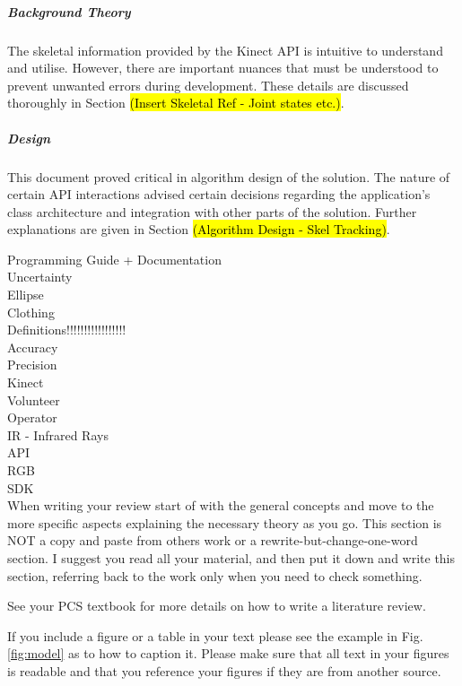 \subparagraph{Background Theory}
The skeletal information provided by the Kinect API is intuitive to understand and utilise. However, there are important nuances that must be understood to prevent unwanted errors during development. These details are discussed thoroughly in Section \hl{(Insert Skeletal Ref - Joint states etc.)}. 

\subparagraph{Design}
This document proved critical in algorithm design of the solution. The nature of certain API interactions advised certain decisions regarding the application's class architecture and integration with other parts of the solution. Further explanations are given in Section \hl{(Algorithm Design - Skel Tracking)}. 

Programming Guide + Documentation\\
Uncertainty\\
Ellipse\\
Clothing\\

Definitions!!!!!!!!!!!!!!!!!\\
Accuracy\\
Precision\\
Kinect\\
Volunteer\\
Operator\\
IR - Infrared Rays\\
API\\
RGB\\
SDK\\


When writing your review start of with the general concepts and move to the more specific aspects
explaining the necessary theory as you go. This section is NOT a copy and paste from others work or a
rewrite-but-change-one-word section. I suggest you read all your material, and then put it down and
write this section, referring back to the work only when you need to check something.

See your PCS textbook for more details on how to write a literature review.

If you include a figure or a table in your text please see the example in Fig. \ref{fig:model} as to how to caption it.
Please make sure that all text in your figures is readable and that you reference your figures if they are
from another source.

